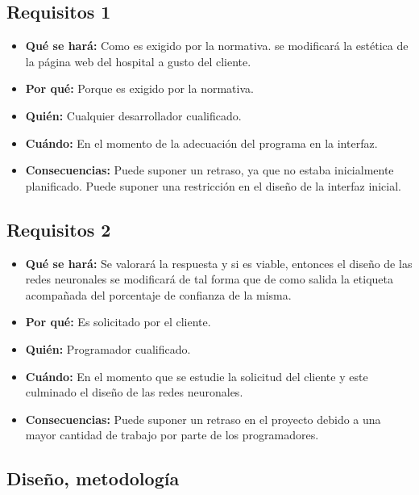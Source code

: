 \subsection{Requisitos 1}

\begin{itemize}
	\item \textbf{Qué se hará: } Como es exigido por la normativa. se modificará la estética de la página web del hospital a gusto del cliente.
	\item \textbf{Por qué: } Porque es exigido por la normativa.
	\item \textbf{Quién: } Cualquier desarrollador cualificado.
	\item \textbf{Cuándo: } En el momento de la adecuación del programa en la interfaz.
	\item \textbf{Consecuencias: } Puede suponer un retraso, ya que no estaba inicialmente planificado. Puede suponer una restricción en el diseño de la interfaz inicial.
\end{itemize}

\subsection{Requisitos 2}

\begin{itemize}
	\item \textbf{Qué se hará: } Se valorará la respuesta y si es viable, entonces el diseño de las redes neuronales se modificará de tal forma que de como salida la etiqueta acompañada del porcentaje de confianza de la misma.
	\item \textbf{Por qué: } Es solicitado por el cliente.
	\item \textbf{Quién: } Programador cualificado.
	\item \textbf{Cuándo: } En el momento que se estudie la solicitud del cliente y este culminado el diseño de las redes neuronales.
	\item \textbf{Consecuencias: } Puede suponer un retraso en el proyecto debido a una mayor cantidad de trabajo por parte de los programadores.
\end{itemize}

\subsection{Diseño, metodología}

